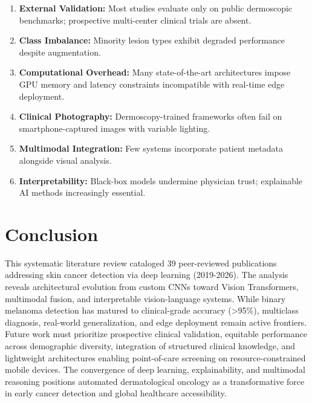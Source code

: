 \documentclass[conference]{IEEEtran}
\begin{document}
\begin{enumerate}
\item \textbf{External Validation:} Most studies evaluate only on public dermoscopic benchmarks; prospective multi-center clinical trials are absent.
\item \textbf{Class Imbalance:} Minority lesion types exhibit degraded performance despite augmentation.
\item \textbf{Computational Overhead:} Many state-of-the-art architectures impose GPU memory and latency constraints incompatible with real-time edge deployment.
\item \textbf{Clinical Photography:} Dermoscopy-trained frameworks often fail on smartphone-captured images with variable lighting.
\item \textbf{Multimodal Integration:} Few systems incorporate patient metadata alongside visual analysis.
\item \textbf{Interpretability:} Black-box models undermine physician trust; explainable AI methods increasingly essential.
\end{enumerate}

\section{Conclusion}

This systematic literature review cataloged 39 peer-reviewed publications addressing skin cancer detection via deep learning (2019-2026). The analysis reveals architectural evolution from custom CNNs toward Vision Transformers, multimodal fusion, and interpretable vision-language systems. While binary melanoma detection has matured to clinical-grade accuracy (>95\%), multiclass diagnosis, real-world generalization, and edge deployment remain active frontiers. Future work must prioritize prospective clinical validation, equitable performance across demographic diversity, integration of structured clinical knowledge, and lightweight architectures enabling point-of-care screening on resource-constrained mobile devices. The convergence of deep learning, explainability, and multimodal reasoning positions automated dermatological oncology as a transformative force in early cancer detection and global healthcare accessibility.



\end{document}
